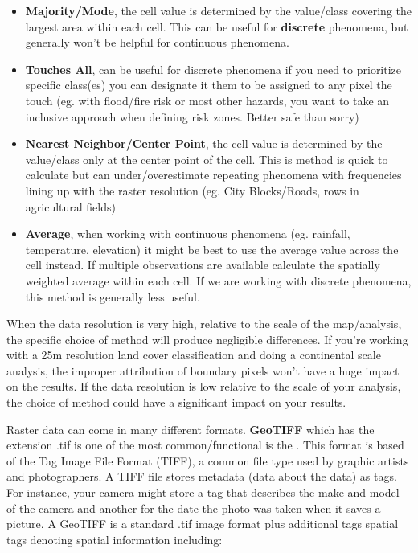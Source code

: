 \documentclass[
]{book}
\begin{document}
\begin{itemize}
\item
  \textbf{Majority/Mode}, the cell value is determined by the value/class covering the largest area within each cell. This can be useful for \textbf{discrete} phenomena, but generally won't be helpful for continuous phenomena.
\item
  \textbf{Touches All}, can be useful for discrete phenomena if you need to prioritize specific class(es) you can designate it them to be assigned to any pixel the touch (eg. with flood/fire risk or most other hazards, you want to take an inclusive approach when defining risk zones. Better safe than sorry)
\item
  \textbf{Nearest Neighbor/Center Point}, the cell value is determined by the value/class only at the center point of the cell. This is method is quick to calculate but can under/overestimate repeating phenomena with frequencies lining up with the raster resolution (eg. City Blocks/Roads, rows in agricultural fields)
\item
  \textbf{Average}, when working with continuous phenomena (eg. rainfall, temperature, elevation) it might be best to use the average value across the cell instead. If multiple observations are available calculate the spatially weighted average within each cell. If we are working with discrete phenomena, this method is generally less useful.
\end{itemize}

When the data resolution is very high, relative to the scale of the map/analysis, the specific choice of method will produce negligible differences. If you're working with a 25m resolution land cover classification and doing a continental scale analysis, the improper attribution of boundary pixels won't have a huge impact on the results. If the data resolution is low relative to the scale of your analysis, the choice of method could have a significant impact on your results.

Raster data can come in many different formats. \textbf{GeoTIFF} which has the extension .tif is one of the most common/functional is the . This format is based of the Tag Image File Format (TIFF), a common file type used by graphic artists and photographers. A TIFF file stores metadata (data about the data) as tags. For instance, your camera might store a tag that describes the make and model of the camera and another for the date the photo was taken when it saves a picture. A GeoTIFF is a standard .tif image format plus additional tags spatial tags denoting spatial information including:
\end{document}
